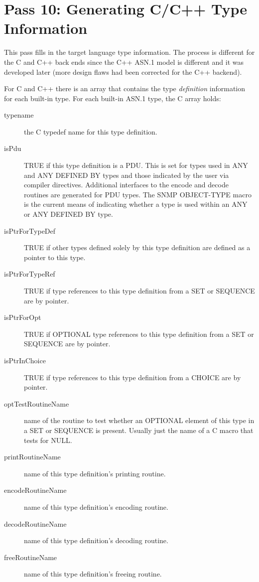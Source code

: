 \section{\label{comp-pass10-section}Pass 10: Generating C/C++ Type Information}

This pass fills in the target language type information.  The process
is different for the C and C++ back ends since the C++ ASN.1 model is
different and it was developed later (more design flaws had been
corrected for the C++ backend).

For C and C++ there is an array that contains the type {\em definition}
information for each built-in type.  For each built-in ASN.1 type, the
C array holds:

\begin{description}
\item[typename] {the C {\C typedef} name for this type definition.}

\item[isPdu]    {TRUE if this type definition is a PDU\@. This is set
for types used in ANY and ANY DEFINED BY types and those indicated by
the user via compiler directives.  Additional interfaces to the encode
and decode routines are generated for PDU types.  The SNMP OBJECT-TYPE
macro is the current means of indicating whether a type is used within
an ANY or ANY DEFINED BY type.}

\item[isPtrForTypeDef] { TRUE if other types defined solely by this type
definition are defined as a pointer to this type.}

\item[isPtrForTypeRef] { TRUE if type references to this type
definition from a SET or SEQUENCE are by pointer.}

\item[isPtrForOpt] { TRUE if OPTIONAL type references to this type
definition from a SET or SEQUENCE are by pointer.}

\item[isPtrInChoice] { TRUE if type references to this type
definition from a CHOICE are by pointer.}

\item[optTestRoutineName] { name of the routine to test whether an
OPTIONAL element of this type in a SET or SEQUENCE is present.
Usually just the name of a C macro that tests for NULL.}

\item[printRoutineName] { name of this type definition's printing routine.}
\item[encodeRoutineName]{ name of this type definition's encoding routine.}
\item[decodeRoutineName]{ name of this type definition's decoding routine.}
\item[freeRoutineName]  { name of this type definition's freeing routine.}
\end{description}

